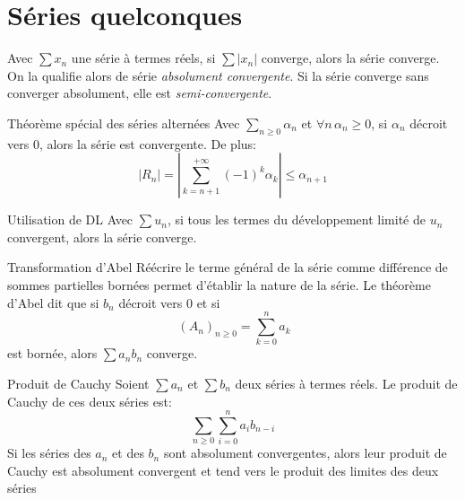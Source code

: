 \documentclass[french, a4paper, 11pt, twocolumn]{article}
\newcommand{\po}{\left(}         %
\newcommand{\pf}{\right)}        %
\newcommand{\pof}[1]{\po #1 \pf} %
\begin{document}
\section{Séries quelconques}
\begin{definition}
  Avec \(\sum x_{n}\) une série à termes  réels, si \(\sum\left| x_{n}\right|\) converge, alors la série converge. On la qualifie alors de série \emph{absolument convergente}. Si la série converge sans converger absolument, elle est \emph{semi-convergente}.
\end{definition}

\begin{theoreme}{Théorème spécial des séries alternées}
  Avec \(\sum_{n\geqslant 0} \alpha_{n}\) et \(\forall n\, \alpha_{n}\geqslant 0\),
  si \(\alpha_{n}\) décroit vers \(0\), alors la série est convergente.
  De plus: \[\left\lvert R_n \right\rvert =\left\lvert\sum_{k=n+1}^{+\infty}(-1)^k \alpha_{k}\right\rvert \leq \alpha_{n+1}\]
\end{theoreme}

\begin{theoreme}{Utilisation de DL}
  Avec \(\sum u_{n}\), si tous les termes du développement limité de \(u_{n}\) convergent, alors la série converge.
\end{theoreme}

\begin{theoreme}{Transformation d'Abel}
  Réécrire le terme général de la série comme différence de sommes partielles bornées permet d'établir la nature de la série.
  \tcblower
  Le théorème d'Abel dit que si \(b_{n}\) décroit vers \(0\) et si \[\ \pof{A_{n}}_{n\geqslant 0}=\sum_{k=0}^n a_k\] est bornée, alors \(\sum a_{n}b_{n}\) converge.
\end{theoreme}

\begin{theoreme}{Produit de Cauchy}
  Soient \(\sum a_{n}\) et \(\sum b_{n}\) deux séries à termes réels. Le produit de Cauchy de ces deux séries est:
  \[\sum_{n\geqslant 0}\sum_{i=0}^{n}a_{i}b_{n-i}\]
  Si les séries des \(a_{n}\) et des \(b_{n}\) sont absolument convergentes, alors leur produit de Cauchy est absolument convergent et tend vers le produit des limites des deux séries
\end{theoreme}
\end{document}
